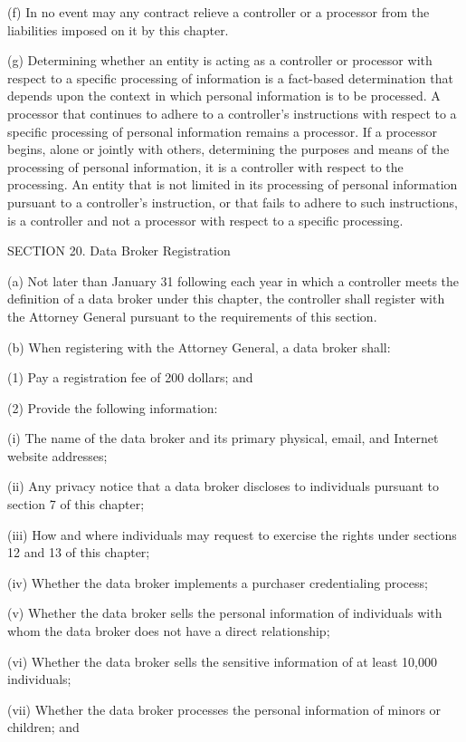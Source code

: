 (f) In no event may any contract relieve a controller or a processor from the liabilities imposed on it by this chapter.

(g) Determining whether an entity is acting as a controller or processor with respect to a specific processing of information is a fact-based determination that depends upon the context in which personal information is to be processed. A processor that continues to adhere to a controller’s instructions with respect to a specific processing of personal information remains a processor. If a processor begins, alone or jointly with others, determining the purposes and means of the processing of personal information, it is a controller with respect to the processing. An entity that is not limited in its processing of personal information pursuant to a controller’s instruction, or that fails to adhere to such instructions, is a controller and not a processor with respect to a specific processing.

SECTION 20. Data Broker Registration

(a) Not later than January 31 following each year in which a controller meets the definition of a data broker under this chapter, the controller shall register with the Attorney General pursuant to the requirements of this section.

(b) When registering with the Attorney General, a data broker shall:

(1) Pay a registration fee of 200 dollars; and  

(2) Provide the following information:

(i) The name of the data broker and its primary physical, email, and Internet website addresses;

(ii) Any privacy notice that a data broker discloses to individuals pursuant to section 7 of this chapter;

(iii) How and where individuals may request to exercise the rights under sections 12 and 13 of this chapter;

(iv) Whether the data broker implements a purchaser credentialing process;

(v) Whether the data broker sells the personal information of individuals with whom the data broker does not have a direct relationship;

(vi) Whether the data broker sells the sensitive information of at least 10,000 individuals;

(vii) Whether the data broker processes the personal information of minors or children; and 

